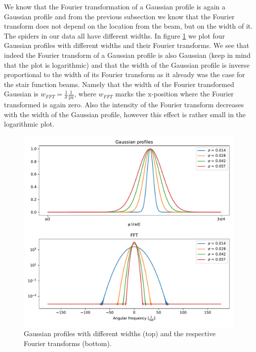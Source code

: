 We know that the Fourier transformation of a Gaussian profile is again a Gaussian profile and from the previous subsection we know that the Fourier transform does not depend on the location from the beam, but on the width of it. The spiders in our data all have different widths. In figure \ref{fig:Gauss_diffwidths} we plot four Gaussian profiles with different widths and their Fourier transforms. We see that indeed the Fourier transform of a Gaussian profile is also Gaussian (keep in mind that the plot is logarithmic) and that the width of the Gaussian profile is inverse proportional to the width of its Fourier transform as it already was the case for the stair function beams. Namely that the width of the Fourier transformed Gaussian is $w_{FFT} = \frac{1}{\sigma} \frac{1}{\mathrm{px}}$, where $w_{FFT}$ marks the x-position where the Fourier transformed is again zero. Also the intensity of the Fourier transform decreases with the width of the Gaussian profile, however this effect is rather small in the logarithmic plot. 
\begin{figure}[H]
	\centering
		\includegraphics[width=1.0\textwidth]{pics/Gauss_diffwidths.pdf}
		\caption{Gaussian profiles with different widths (top) and the respective Fourier transforms (bottom).}
		\label{fig:Gauss_diffwidths}
\end{figure} 
